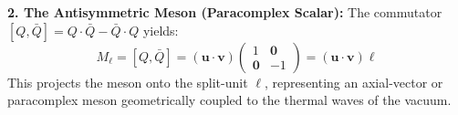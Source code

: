 \textbf{2. The Antisymmetric Meson (Paracomplex Scalar):}
The commutator $[Q, \bar{Q}] = Q \cdot \bar{Q} - \bar{Q} \cdot Q$ yields:
\begin{equation}
M_\ell = [Q, \bar{Q}] = (\mathbf{u} \cdot \mathbf{v}) \begin{pmatrix} 1 & \mathbf{0} \\ \mathbf{0} & -1 \end{pmatrix} = (\mathbf{u} \cdot \mathbf{v}) \ell
\end{equation}
This projects the meson onto the split-unit $\ell$, representing an axial-vector or paracomplex meson geometrically coupled to the thermal waves of the vacuum.


